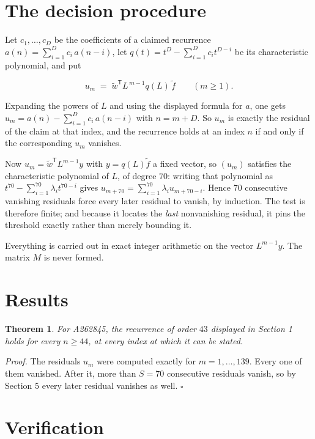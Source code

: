 \documentclass[11pt]{article}
\newtheorem{theorem}{Theorem}
\theoremstyle{definition}
\begin{document}
\section{The decision procedure}

Let $c_1,\dots,c_D$ be the coefficients of a claimed recurrence $a(n) = \sum_{i=1}^{D} c_i\,a(n-i)$, let $q(t) = t^{D} - \sum_{i=1}^{D} c_i t^{D-i}$ be its characteristic polynomial, and put

\[u_m \;=\; \tilde w^{\mathsf T} L^{\,m-1} q(L)\,\tilde f \qquad (m \ge 1).\]

Expanding the powers of $L$ and using the displayed formula for $a$, one gets $u_m = a(n) - \sum_{i=1}^{D} c_i\,a(n-i)$ with $n = m + D$. So $u_m$ is exactly the residual of the claim at that index, and the recurrence holds at an index $n$ if and only if the corresponding $u_m$ vanishes.

Now $u_m = \tilde w^{\mathsf T} L^{m-1} y$ with $y = q(L)\tilde f$ a fixed vector, so $(u_m)$ satisfies the characteristic polynomial of $L$, of degree $70$: writing that polynomial as $t^{70} - \sum_{i=1}^{70} \lambda_i t^{70-i}$ gives $u_{m+70} = \sum_{i=1}^{70} \lambda_i u_{m+70-i}$. Hence $70$ consecutive vanishing residuals force every later residual to vanish, by induction. The test is therefore finite; and because it locates the {\itshape last} nonvanishing residual, it pins the threshold exactly rather than merely bounding it.

Everything is carried out in exact integer arithmetic on the vector $L^{m-1}y$. The matrix $M$ is never formed.

\section{Results}

\begin{theorem} For A262845, the recurrence of order $43$ displayed in Section 1 holds for every $n \ge 44$, at every index at which it can be stated.\end{theorem}

{\itshape Proof.} The residuals $u_m$ were computed exactly for $m = 1,\dots,139$. Every one of them vanished. After it, more than $S = 70$ consecutive residuals vanish, so by Section 5 every later residual vanishes as well. $\square$

\section{Verification}
\end{document}
